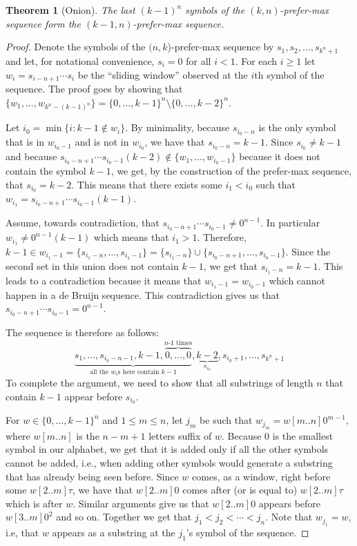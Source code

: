 \documentclass{article}
\newtheorem{reptheorem}{Theorem}
\newenvironment{repeatedtheorem}[1]
{
	\setcounterref{reptheorem}{#1}
	\addtocounter{reptheorem}{-1}
	\begin{reptheorem}
	}{			
	\end{reptheorem}
}
\theoremstyle{definition}
\begin{document}
\begin{repeatedtheorem}{thm:onion}[Onion]
	{The last $(k-1)^n$ symbols of the $(k,n)$-prefer-max sequence form the $(k-1,n)$-prefer-max sequence.}
\end{repeatedtheorem}
\begin{proof}
	Denote the symbols of the $(n,k$)-prefer-max sequence by
	$s_1,s_2,\dots,s_{k^n+1}$ and let, for notational convenience, $s_i=0$ for all
	$i<1$.  For each $i\geq 1$ let $w_i=s_{i-n+1}\cdots s_i$ be the ``sliding window''
	observed at the $i$th symbol of the sequence. 
	The proof goes by showing that $\{w_1,\dots,w_{k^n-(k-1)^n}\} = \{0,\dots,k-1\}^n \setminus \{0,\dots,k-2\}^n$.
	
	Let ${i_0} = \min\{i\colon k-1 \notin w_i\}$. 
	By minimality, because  $s_{{i_0}-n}$ is the only symbol that is in $w_{i_0-1}$ and is not in $w_{i_0}$, 
	we have that $s_{{i_0}-n}=k-1$. Since $s_{i_0} \neq k-1$ and
	because $s_{{i_0}-n+1}\cdots s_{{i_0}-1} (k-2) \notin \{w_1,\dots,w_{i_0-1}\}$ because it does not contain the symbol $k-1$, 
	we get, by the construction of the prefer-max sequence,
	that $s_{{i_0}}=k-2$. This means that there exists some ${i_1}<{i_0}$ such that
	$w_{i_1} = s_{{i_0}-n+1}\cdots s_{{i_0}-1}(k-1)$.
	
	Assume, towards contradiction, that $s_{{i_0}-n+1}\cdots s_{{i_0}-1} \neq
	0^{n-1}$. In particular $w_{i_1} \neq 0^{n-1}(k-1)$ which
	means that ${i_1} > 1$. Therefore, $k-1  \in w_{i_1-1}=
	\{s_{{i_1}-n},\dots,s_{{i_1}-1}\}=\{s_{{i_1}-n}\} \cup
	\{s_{{i_0}-n+1},\dots,s_{{i_0}-1}\}$. Since the second set in this union does
	not contain $k-1$, we get that $s_{{i_1}-n}=k-1$. This leads to a contradiction
	because it means that $w_{{i_1}-1} = w_{{i_0}-1}$ which cannot happen in a de Bruijn sequence. This contradiction
	gives us that $s_{{i_0}-n+1}\cdots s_{{i_0}-1} = 0^{n-1}$.
	
	The sequence is therefore as follows:
	$$\underbrace{s_1,\dots,s_{i_0-n-1},k-1,\overbrace{0,\dots,0}^\text{$n\text{-}1$ times}}_{\text{all the $w_i$s here contain
				$k-1$}},\underbrace{k-2}_{s_{i_0}},s_{i_0+1},\dots,s_{k^n+1}$$
	To complete the argument, we need to show that all substrings of length $n$ that
	contain $k-1$ appear before $s_{i_0}$.
	
	For $w \in \{0,\dots,k-1\}^n$ and $1 \leq m \leq n$, let $j_m$ be such that
	$w_{j_m} = w[m..n]0^{m-1}$, where $w[m..n]$ is the $n-m+1$
	letters suffix of $w$. 
	Because $0$ is the smallest symbol in our alphabet, we get that it is added
	only if all the other symbols cannot be added, i.e., when adding other symbols
	would generate a substring that has already being seen before. 
	Since $w$ comes, as a window, right before some $w[2..m]\tau$,
	we have that $w[2..m]0$ comes after (or is equal to) $w[2..m]\tau$ which is
	after $w$. Similar arguments give us that $w[2..m]0$ appears before $w[3..m]0^2$ and
	so on. Together we get that $j_1 < j_2 < \cdots < j_n$. Note that $w_{j_1}=w$, 
	i.e, that $w$ appears as a substring at the $j_1$'s symbol of the
	sequence.
	

\end{proof}
\end{document}
